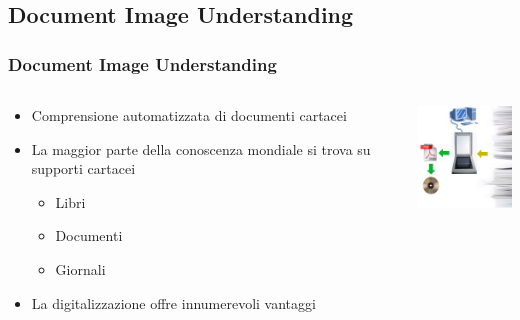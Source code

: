 \documentclass{beamer}
\begin{document}
\subsection{Document Image Understanding}
\begin{frame}
\frametitle{Document Image Understanding}

\begin{columns}
\begin{column}{0.6\textwidth}

\begin{itemize}
\item<1-> Comprensione automatizzata di documenti cartacei
\item<2-> La maggior parte della conoscenza mondiale si trova su supporti cartacei
\begin{itemize}
\item Libri
\item Documenti
\item Giornali
\end{itemize}
\item<3-> La digitalizzazione offre innumerevoli vantaggi
\end{itemize}
\end{column}

\begin{column}{0.2\textwidth}
\includegraphics[width=3cm]{figure/diu.jpg}
\end{column}

\end{columns}

\end{frame}


\end{document}
